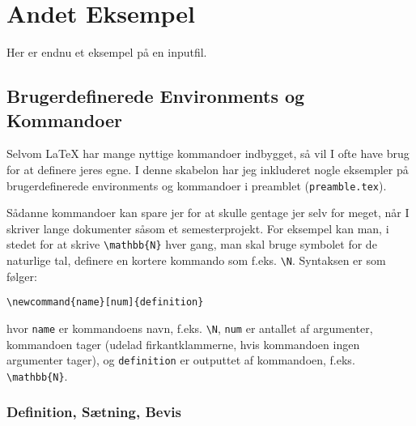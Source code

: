 
\chapter{Andet Eksempel}
\label{ch:second-example}

Her er endnu et eksempel på en inputfil.


\section{Brugerdefinerede Environments og Kommandoer}
\label{sec:custom}

Selvom \LaTeX{} har mange nyttige kommandoer indbygget, så vil I ofte have brug for at definere jeres egne.
I denne skabelon har jeg inkluderet nogle eksempler på brugerdefinerede environments og kommandoer i preamblet (\texttt{preamble.tex}).

Sådanne kommandoer kan spare jer for at skulle gentage jer selv for meget, når I skriver lange dokumenter såsom et semesterprojekt.
For eksempel kan man, i stedet for at skrive \verb!\mathbb{N}! hver gang, man skal bruge symbolet for de naturlige tal, definere en kortere kommando som f.eks. \verb!\N!.
Syntaksen er som følger:
% 
\begin{verbatim}
\newcommand{name}[num]{definition}
\end{verbatim}
%
hvor \texttt{name} er kommandoens navn, f.eks. \verb!\N!, \texttt{num} er antallet af argumenter, kommandoen tager (udelad firkantklammerne, hvis kommandoen ingen argumenter tager), og \texttt{definition} er outputtet af kommandoen, f.eks. \verb!\mathbb{N}!.


\subsection{Definition, Sætning, Bevis}
\label{sec:thms}

